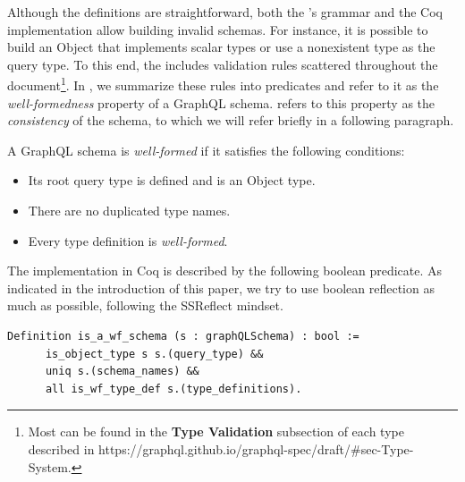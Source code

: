
Although the definitions are straightforward, both the \spec{}'s grammar and the Coq implementation allow building invalid schemas. For instance, it is possible to build an Object that implements scalar types or use a nonexistent type as the query type. To this end, the \spec{} includes validation rules scattered throughout the document\footnote{Most can be found in the \textbf{Type Validation} subsection of each type described in https://graphql.github.io/graphql-spec/draft/\#sec-Type-System.}. In \coql, we summarize these rules into predicates and refer to it as the \textit{well-formedness} property of a GraphQL schema. \HP{} refers to this property as the \textit{consistency} of the schema, to which we will refer briefly in a following paragraph.


\begin{definition}
A GraphQL schema is \textit{well-formed} if it satisfies the following conditions:
\begin{itemize}
    \item Its root query type is defined and is an Object type.
    \item There are no duplicated type names.
    \item Every type definition is \textit{well-formed}.
\end{itemize}
\end{definition}

The implementation in Coq is described by the following boolean predicate. As indicated in the introduction of this paper, we try to use boolean reflection as much as possible, following the SSReflect mindset.

\begin{verbatim}
Definition is_a_wf_schema (s : graphQLSchema) : bool :=
      is_object_type s s.(query_type) &&
      uniq s.(schema_names) &&
      all is_wf_type_def s.(type_definitions).
\end{verbatim}

